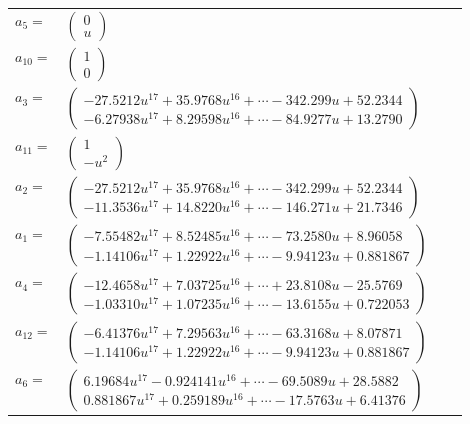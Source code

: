 \documentclass[1p]{elsarticle_modified}
\theoremstyle{definition}
\begin{document}
\begin{tabular}{m{7pt} m{180pt} m{7pt} m{180pt} }
\flushright $a_{5}=$&$\begin{pmatrix}0\\u\end{pmatrix}$ \\
\flushright $a_{10}=$&$\begin{pmatrix}1\\0\end{pmatrix}$ \\
\flushright $a_{3}=$&$\begin{pmatrix}-27.5212 u^{17}+35.9768 u^{16}+\cdots-342.299 u+52.2344\\-6.27938 u^{17}+8.29598 u^{16}+\cdots-84.9277 u+13.2790\end{pmatrix}$ \\
\flushright $a_{11}=$&$\begin{pmatrix}1\\- u^2\end{pmatrix}$ \\
\flushright $a_{2}=$&$\begin{pmatrix}-27.5212 u^{17}+35.9768 u^{16}+\cdots-342.299 u+52.2344\\-11.3536 u^{17}+14.8220 u^{16}+\cdots-146.271 u+21.7346\end{pmatrix}$ \\
\flushright $a_{1}=$&$\begin{pmatrix}-7.55482 u^{17}+8.52485 u^{16}+\cdots-73.2580 u+8.96058\\-1.14106 u^{17}+1.22922 u^{16}+\cdots-9.94123 u+0.881867\end{pmatrix}$ \\
\flushright $a_{4}=$&$\begin{pmatrix}-12.4658 u^{17}+7.03725 u^{16}+\cdots+23.8108 u-25.5769\\-1.03310 u^{17}+1.07235 u^{16}+\cdots-13.6155 u+0.722053\end{pmatrix}$ \\
\flushright $a_{12}=$&$\begin{pmatrix}-6.41376 u^{17}+7.29563 u^{16}+\cdots-63.3168 u+8.07871\\-1.14106 u^{17}+1.22922 u^{16}+\cdots-9.94123 u+0.881867\end{pmatrix}$ \\
\flushright $a_{6}=$&$\begin{pmatrix}6.19684 u^{17}-0.924141 u^{16}+\cdots-69.5089 u+28.5882\\0.881867 u^{17}+0.259189 u^{16}+\cdots-17.5763 u+6.41376\end{pmatrix}$ \\

\end{tabular}
\end{document}
